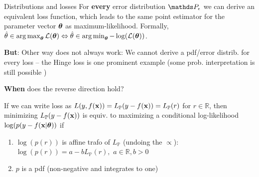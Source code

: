 \documentclass[11pt,compress,t,notes=noshow, xcolor=table]{beamer}
\begin{document}
\begin{vbframe}{Distributions and losses}
For \textbf{every} error distribution $\P_\eps$ we can derive an equivalent loss function, which leads to the same point estimator for the parameter vector $\bm{\theta}$ as maximum-likelihood. Formally, $\hat{\theta} \in \mathop{\mathrm{arg\,max}}_{\bm{\theta}} \mathcal{L}(\bm{\theta}) \Leftrightarrow \hat{\theta} \in \mathop{\mathrm{arg\,min}}_{\bm{\theta}}-\log(\mathcal{L}(\bm{\theta}))$.  %
    
\vspace{0.2cm}    
\textbf{But}: Other way does not always work: We cannot derive a pdf/error distrib. for every loss -- the Hinge loss is one prominent example (some prob. interpretation is still possible )

\vspace{0.2cm}
\textbf{When} does the reverse direction hold?

If we can write loss as $L(y,f(\mathbf{x}))=L_{\mathbb{P}}(y-f(\mathbf{x}))=L_{\mathbb{P}}(r)$ for $r \in \mathbb{R}$, then minimizing $L_{\mathbb{P}}(y-f(\mathbf{x}))$ is equiv. to maximizing a conditional log-likelihood $\log(p(y-f(\mathbf{x}|\bm{\theta}))$ if
\begin{enumerate}
 \setlength{\itemsep}{1.0em}
    \item $\log(p(r))$ is affine trafo of $L_{\mathbb{P}}$ (undoing the $\propto$):
    $\log(p(r)) = a - bL_{\mathbb{P}}(r),\,\,a \in \mathbb{R}, b>0$
    \item  $p$ is a pdf (non-negative and integrates to one)
\end{enumerate}

\end{vbframe}


\endlecture
\end{document}
